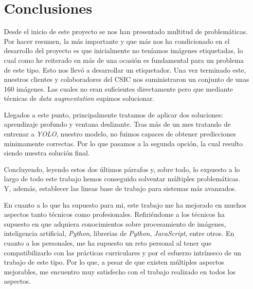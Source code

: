

\section{Conclusiones}

Desde el inicio de este proyecto se nos han presentado multitud de problemáticas. Por hacer resumen, la más importante y que más nos ha condicionado en el desarrollo del proyecto es que inicialmente no teníamos imágenes etiquetadas, lo cual como he reiterado en más de una ocasión es fundamental para un problema de este tipo. Esto nos llevó a desarrollar un etiquetador. Una vez terminado este, nuestros clientes y colaboradores del CSIC nos suministraron un conjunto de unas 160 imágenes. Las cuales no eran suficientes directamente pero que mediante técnicas de \textit{data augmentation} supimos solucionar.

Llegados a este punto, principalmente tratamos de aplicar dos soluciones: aprendizaje profundo y ventana deslizante. Tras más de un mes tratando de entrenar a \textit{YOLO}, nuestro modelo, no fuimos capaces de obtener predicciones minimamente correctas. Por lo que pasamos a la segunda opción, la cual resulto siendo nuestra solución final.

Concluyendo, leyendo estos dos últimos párrafos y, sobre todo, lo expuesto a lo largo de todo este trabajo hemos conseguido solventar múltiples problemáticas. Y, además, establecer las lineas base de trabajo para sistemas más avanzados.

En cuanto a lo que ha supuesto para mi, este trabajo me ha mejorado en muchos aspectos tanto técnicos como profesionales. Refiriéndome a los técnicos ha supuesto en que adquiera conocimientos sobre procesamiento de imágenes, inteligencia artificial, \textit{Python}, librerias de \textit{Python}, \textit{JavaScript}, entre otros. En cuanto a los personales, me ha supuesto un reto personal al tener que compatibilizarlo con las prácticas curriculares y por el esfuerzo intrínseco de un trabajo de este tipo. Por lo que, a pesar de que existen múltiples aspectos mejorables, me encuentro muy satisfecho con el trabajo realizado en todos los aspectos.

